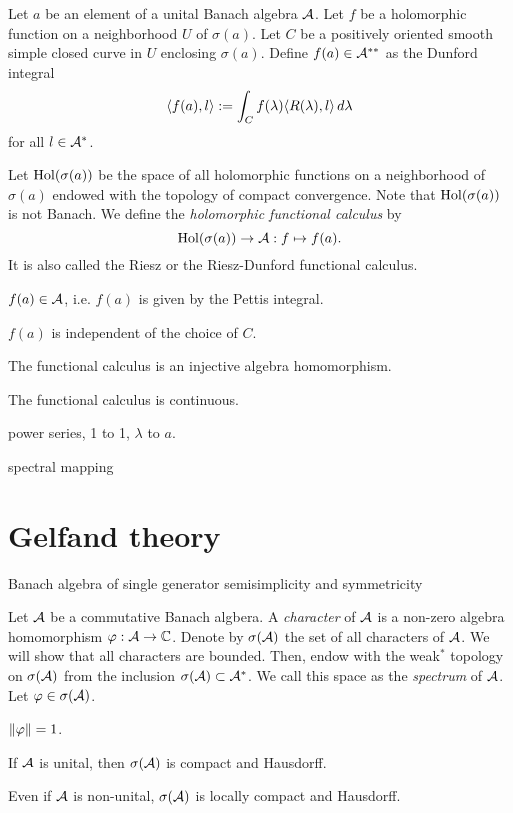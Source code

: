 \documentclass{../../large}
\begin{document}
\begin{prb}
Let $a$ be an element of a unital Banach algebra $\mathcal{A}$.
Let $f$ be a holomorphic function on a neighborhood $U$ of $\sigma(a)$.
Let $C$ be a positively oriented smooth simple closed curve in $U$ enclosing $\sigma(a)$.
Define $f(a)\in\mathcal{A}^{**}$ as the Dunford integral
\[\langle f(a),l\rangle:=\int_Cf(\lambda)\langle R(\lambda),l\rangle\,d\lambda\]
for all $l\in\mathcal{A}^*$.

Let $\operatorname{Hol}(\sigma(a))$ be the space of all holomorphic functions on a neighborhood of $\sigma(a)$ endowed with the topology of compact convergence.
Note that $\operatorname{Hol}(\sigma(a))$ is not Banach.
We define the \emph{holomorphic functional calculus} by
\[\operatorname{Hol}(\sigma(a))\to\mathcal{A}:f\mapsto f(a).\]
It is also called the Riesz or the Riesz-Dunford functional calculus.
\begin{parts}
\item $f(a)\in\mathcal{A}$, i.e. $f(a)$ is given by the Pettis integral.
\item $f(a)$ is independent of the choice of $C$.
\item The functional calculus is an injective algebra homomorphism.
\item The functional calculus is continuous.
\item power series, 1 to 1, $\lambda$ to $a$.
\end{parts}
\end{prb}

spectral mapping




\section{Gelfand theory}

Banach algebra of single generator
semisimplicity and symmetricity

\begin{prb}
Let $\mathcal{A}$ be a commutative Banach algbera.
A \emph{character} of $\mathcal{A}$ is a non-zero algebra homomorphism $\varphi:\mathcal{A}\to\mathbb{C}$.
Denote by $\sigma(\mathcal{A})$ the set of all characters of $\mathcal{A}$.
We will show that all characters are bounded.
Then, endow with the weak$^*$ topology on $\sigma(\mathcal{A})$ from the inclusion $\sigma(\mathcal{A})\subset\mathcal{A}^*$.
We call this space as the \emph{spectrum} of $\mathcal{A}$.
Let $\varphi\in\sigma(\mathcal{A})$.
\begin{parts}
\item $\|\varphi\|=1$.
\item If $\mathcal{A}$ is unital, then $\sigma(\mathcal{A})$ is compact and Hausdorff.
\item Even if $\mathcal{A}$ is non-unital, $\sigma(\mathcal{A})$ is locally compact and Hausdorff.
\end{parts}
\end{prb}
\end{document}
